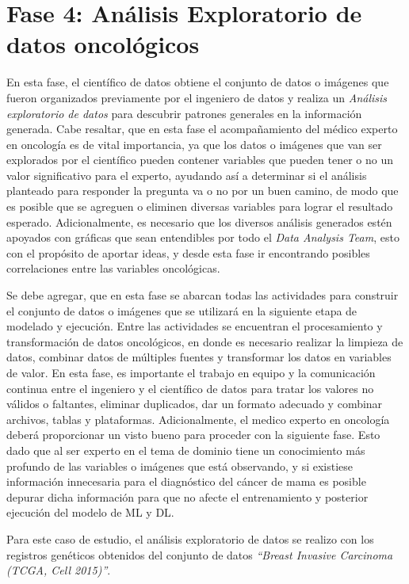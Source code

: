 \section{Fase 4: Análisis Exploratorio de datos oncológicos}

En esta fase, el científico de datos obtiene el conjunto de datos o imágenes que fueron organizados previamente por el ingeniero de datos y realiza un \textit{Análisis exploratorio de datos} para descubrir patrones generales en la información generada. Cabe resaltar, que en esta fase el acompañamiento del médico experto en oncología es de vital importancia, ya que los datos o imágenes que van ser explorados por el científico pueden contener variables que pueden tener o no un valor significativo para el experto, ayudando así a determinar si el análisis planteado para responder la pregunta va o no por un buen camino, de modo que es posible que se agreguen o eliminen diversas variables para lograr el resultado esperado. Adicionalmente, es necesario que los diversos análisis generados estén apoyados con gráficas que sean entendibles por todo el \textit{Data Analysis Team}, esto con el propósito de aportar ideas, y desde esta fase ir encontrando posibles correlaciones entre las variables oncológicas.

Se debe agregar, que en esta fase se abarcan todas las actividades para construir el conjunto de datos o imágenes que se utilizará en la siguiente etapa de modelado y ejecución. Entre las actividades se encuentran el procesamiento y transformación de datos oncológicos, en donde es necesario realizar la limpieza de datos, combinar datos de múltiples fuentes y transformar los datos en variables de valor. En esta fase, es importante el trabajo en equipo y la comunicación continua entre el ingeniero y el científico de datos para tratar los valores no válidos o faltantes, eliminar duplicados, dar un formato adecuado y combinar archivos, tablas y plataformas. Adicionalmente, el medico experto en oncología deberá proporcionar un visto bueno para proceder con la siguiente fase. Esto dado que al ser experto en el tema de dominio tiene un conocimiento más profundo de las variables o imágenes que está observando, y si existiese información innecesaria para el diagnóstico del cáncer de mama es posible depurar dicha información para que no afecte el entrenamiento y posterior ejecución del modelo de ML y DL.

Para este caso de estudio, el análisis exploratorio de datos se realizo con los registros genéticos obtenidos del conjunto de datos \textit{“Breast Invasive Carcinoma (TCGA, Cell 2015)”}.











